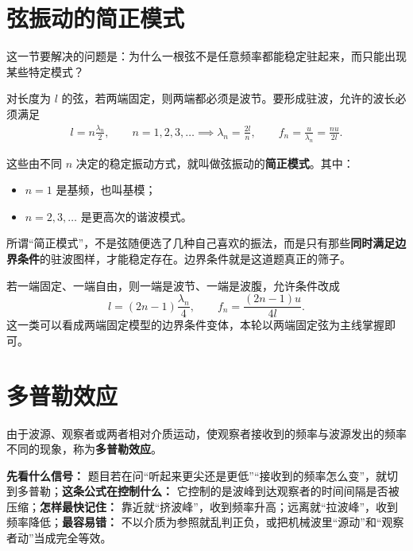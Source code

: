 \documentclass[lang=cn,11pt]{elegantbook}
\newcommand{\bridge}[1]{\begin{note}#1\end{note}}
\begin{document}
\section{弦振动的简正模式}

这一节要解决的问题是：为什么一根弦不是任意频率都能稳定驻起来，而只能出现某些特定模式？

对长度为 \(l\) 的弦，若两端固定，则两端都必须是波节。要形成驻波，允许的波长必须满足
\[
\begin{aligned}
l=n\frac{\lambda_n}{2},\qquad n=1,2,3,\dots
\implies
\lambda_n=\frac{2l}{n},\qquad
f_n=\frac{u}{\lambda_n}=\frac{nu}{2l}.
\end{aligned}
\]

这些由不同 \(n\) 决定的稳定振动方式，就叫做弦振动的\textbf{简正模式}。其中：
\begin{itemize}
  \item \(n=1\) 是基频，也叫基模；
  \item \(n=2,3,\dots\) 是更高次的谐波模式。
\end{itemize}

\bridge{所谓“简正模式”，不是弦随便选了几种自己喜欢的振法，而是只有那些\textbf{同时满足边界条件}的驻波图样，才能稳定存在。边界条件就是这道题真正的筛子。}

\begin{note}
若一端固定、一端自由，则一端是波节、一端是波腹，允许条件改成
\[
l=(2n-1)\frac{\lambda_n}{4},\qquad
f_n=\frac{(2n-1)u}{4l}.
\]
这一类可以看成两端固定模型的边界条件变体，本轮以两端固定弦为主线掌握即可。
\end{note}

\section{多普勒效应}

\begin{definition}[多普勒效应]
由于波源、观察者或两者相对介质运动，使观察者接收到的频率与波源发出的频率不同的现象，称为\textbf{多普勒效应}。
\end{definition}

\begin{note}
\textbf{先看什么信号：} 题目若在问“听起来更尖还是更低”“接收到的频率怎么变”，就切到多普勒；\textbf{这条公式在控制什么：} 它控制的是波峰到达观察者的时间间隔是否被压缩；\textbf{怎样最快记住：} 靠近就“挤波峰”，收到频率升高；远离就“拉波峰”，收到频率降低；\textbf{最容易错：} 不以介质为参照就乱判正负，或把机械波里“源动”和“观察者动”当成完全等效。
\end{note}
\end{document}
